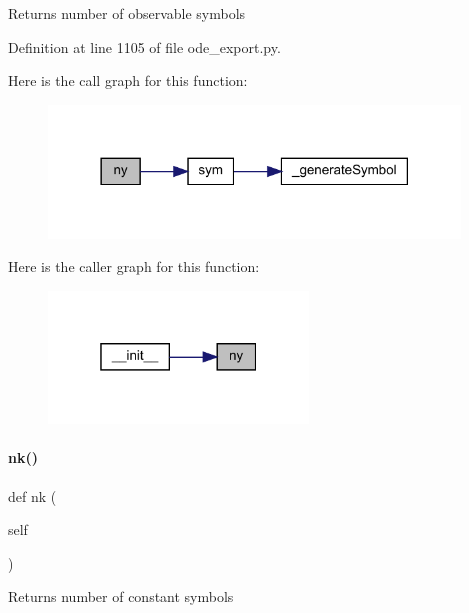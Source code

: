 \begin{DoxyReturn}{Returns}
number of observable symbols 
\end{DoxyReturn}


Definition at line 1105 of file ode\+\_\+export.\+py.

Here is the call graph for this function\+:
\nopagebreak
\begin{figure}[H]
\begin{center}
\leavevmode
\includegraphics[width=310pt]{classamici_1_1ode__export_1_1_o_d_e_model_ac3d9b681827ebea0e5bee18c9d7fc44d_cgraph}
\end{center}
\end{figure}
Here is the caller graph for this function\+:
\nopagebreak
\begin{figure}[H]
\begin{center}
\leavevmode
\includegraphics[width=196pt]{classamici_1_1ode__export_1_1_o_d_e_model_ac3d9b681827ebea0e5bee18c9d7fc44d_icgraph}
\end{center}
\end{figure}
\mbox{\label{classamici_1_1ode__export_1_1_o_d_e_model_a07767f24c77537a68972e99a79ef93aa}} 
\paragraph{\texorpdfstring{nk()}{nk()}}
{\footnotesize\ttfamily def nk (\begin{DoxyParamCaption}\item[{}]{self }\end{DoxyParamCaption})}

\begin{DoxyReturn}{Returns}
number of constant symbols 
\end{DoxyReturn}


